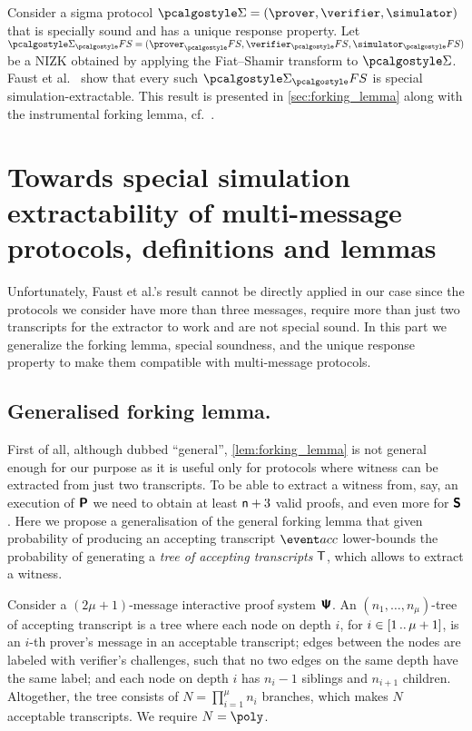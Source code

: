\documentclass[runningheads,11pt]{llncs}
\begin{document}
\begin{remark}
Consider a sigma protocol $\sigmaprot = (\prover, \verifier, \simulator)$ that
is specially sound and has a unique response property. Let $\sigmaprot_\fs =
(\prover_\fs, \verifier_\fs, \simulator_\fs)$ be a NIZK obtained by applying the
Fiat--Shamir transform to $\sigmaprot$. Faust et al.~\cite{INDOCRYPT:FKMV12}
show that every such $\sigmaprot_\fs$ is special simulation-extractable. This result is
presented in \cref{sec:forking_lemma} along with the instrumental forking lemma,
cf.~\cite{CCS:BelNev06}.
\end{remark}


\section{Towards special simulation extractability of multi-message protocols,
  definitions and lemmas}
\label{sec:se_definitions}
Unfortunately, Faust et al.'s result cannot be directly applied in our case
since the protocols we consider have more than three messages, require more than
just two transcripts for the extractor to work and are not special
sound. In this part we generalize the forking lemma, special
soundness, and the unique response property to make them compatible with
multi-message protocols.

\subsection{Generalised forking lemma.}
First of all, although dubbed ``general'', \cref{lem:forking_lemma} is not
general enough for our purpose as it is useful only for protocols where witness
can be extracted from just two transcripts. To be able to extract a witness
from, say, an execution of $\bm{\mathsf{P}}$ we need to obtain at least
$\mathsf{n} + 3$ valid proofs, and even more for $\bm{\mathsf{S}}$. Here we
propose a generalisation of the general forking lemma that given probability of
producing an accepting transcript $\accProb$ lower-bounds the probability of
generating a \emph{tree of accepting transcripts} $\mathsf{T}$, which allows to
extract a witness.

\begin{definition}
	\label{def:tree_of_accepting_transcripts}
	Consider a $(2\mu + 1)$-message interactive proof system $\bm{\mathsf{\Psi}}$. An $(n_1,
  \ldots, n_\mu)$-tree of accepting transcript is a tree where each node on
  depth $i$, for $i \in [1 \, .. \, \mu + 1]$, is an $i$-th prover's message in an
  acceptable transcript; edges between the nodes are labeled with verifier's
  challenges, such that no two edges on the same depth have the same
  label; and each node on depth $i$ has $n_{i} - 1$ siblings and $n_{i +
    1}$ children. Altogether, the tree consists of $N = \prod_{i = 1}^\mu n_i$
  branches, which makes $N$ acceptable transcripts. We require $N = \poly$.
\end{definition}
\end{document}
